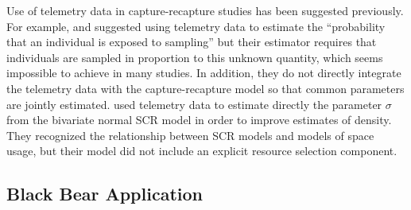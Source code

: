 \documentclass[12pt]{article}
\begin{document}
Use of telemetry data in capture-recapture studies has been suggested
previously. For example, \citet{white_shenk:2001} and
\citet{ivan:2012} suggested using telemetry data to estimate the
``probability that an individual is exposed to sampling'' but
their estimator requires that individuals are sampled in proportion to
this unknown quantity, which seems impossible to achieve in many
studies. In addition, they do not directly integrate the telemetry
data with the capture-recapture model so that common parameters are
jointly estimated.
 \citet{sollmann_etal:inprepjapplecol}
 used telemetry data to estimate directly the parameter $\sigma$ from
 the bivariate normal SCR model in order to improve estimates of
 density. They recognized the relationship between SCR models and
 models of space usage, but their model did not include an explicit
 resource selection component.




\subsection{Black Bear Application}
\end{document}
